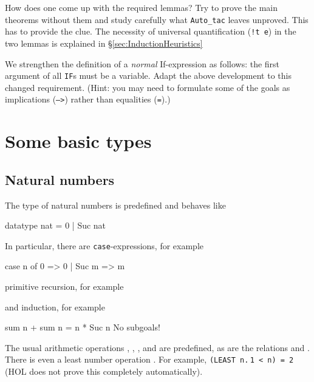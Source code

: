 How does one come up with the required lemmas? Try to prove the main theorems
without them and study carefully what \texttt{Auto_tac} leaves unproved. This
has to provide the clue.
The necessity of universal quantification (\texttt{!t e}) in the two lemmas
is explained in \S\ref{sec:InductionHeuristics}

\begin{exercise}
  We strengthen the definition of a {\em normal\/} If-expression as follows:
  the first argument of all \texttt{IF}s must be a variable. Adapt the above
  development to this changed requirement. (Hint: you may need to formulate
  some of the goals as implications (\texttt{-->}) rather than equalities
  (\texttt{=}).)
\end{exercise}

\section{Some basic types}

\subsection{Natural numbers}

The type  of natural numbers is predefined and behaves like
\begin{ttbox}
datatype nat = 0 | Suc nat
\end{ttbox}
In particular, there are \texttt{case}-expressions, for example
\begin{ttbox}
case n of 0 => 0 | Suc m => m
\end{ttbox}
primitive recursion, for example
\begin{ttbox}
\end{ttbox}
and induction, for example
\begin{ttbox}
\ttbreak
{\out sum n + sum n = n * Suc n}
{\out No subgoals!}
\end{ttbox}

The usual arithmetic operations \ttindexbold{+}, \ttindexbold{-},
\ttindexbold{*},  and  are predefined, as
are the relations \ttindexbold{<=} and \ttindexbold{<}. There is even a least
number operation . For example, \texttt{(LEAST n.$\,$1 <
  n) = 2} (HOL does not prove this completely automatically).

